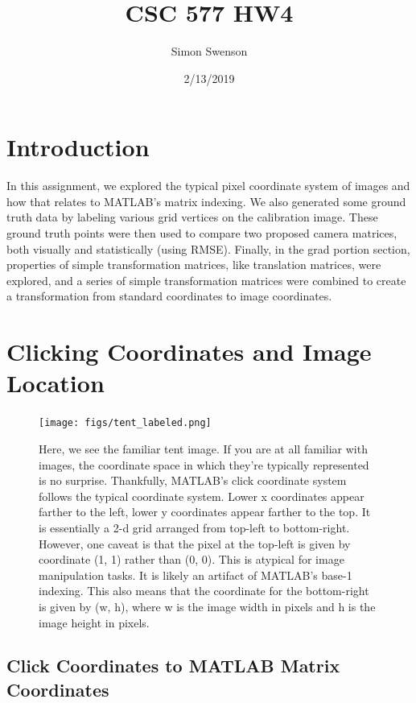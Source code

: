 \documentclass{article}
\title{CSC 577 HW4}
\date{2/13/2019}
\author{Simon Swenson}
\begin{document}
\maketitle
{}

\section{Introduction}

In this assignment, we explored the typical pixel coordinate system of images and how 
that relates to MATLAB's matrix indexing. We also generated some ground truth 
data by labeling various grid vertices on the calibration image. These ground 
truth points were then used to compare two proposed camera matrices, both 
visually and statistically (using RMSE). Finally, in the grad portion section, 
properties of simple transformation matrices, like translation matrices, were 
explored, and a series of simple transformation matrices were combined to create 
a transformation from standard coordinates to image coordinates.

\section{Clicking Coordinates and Image Location}

\begin{figure}[!ht]
	\centering
	\texttt{[image: figs/tent\_labeled.png]}
	\caption{Here, we see the familiar tent image. If you are at all familiar 
        with images, the coordinate space in which they're typically represented 
        is no surprise. Thankfully, MATLAB's click coordinate system follows the 
        typical coordinate system. Lower x coordinates appear farther to the left, lower y 
        coordinates 
        appear farther to the top. It is essentially a 2-d grid arranged from top-left 
        to bottom-right. However, one caveat is that the pixel at the top-left 
        is given by coordinate (1, 1) rather than (0, 0). This is atypical for 
        image manipulation tasks. It is likely an artifact of MATLAB's base-1 
        indexing. This also means that the coordinate for the bottom-right is 
        given by (w, h), where w is the image width in pixels and h is the image 
        height in pixels.}
\end{figure}

\subsection{Click Coordinates to MATLAB Matrix Coordinates}
\end{document}

